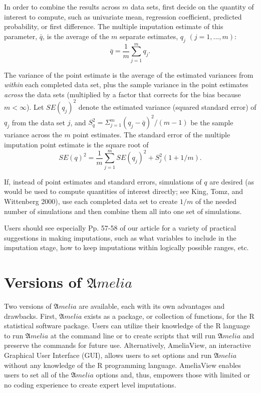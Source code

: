 \documentclass[12pt,titlepage]{article}
\newcommand{\Amelia}{\ensuremath{\mathfrak Amelia} }
\begin{document}
In order to combine the results across $m$ data sets, first decide on the quantity of interest to compute, such as univariate mean, regression coefficient, predicted probability, or first difference.  The multiple imputation estimate of this parameter, $\bar{q}$, is the average of the $m$ separate estimates, $q_j$ $(j=1,...,m)$:
\begin{equation}
\bar{q}=\frac{1}{m}\sum^{m}_{j=1}q_j.  
\end{equation}

The variance of the point estimate is the average of the estimated variances from \emph{within} each completed data set, plus the sample variance in the point estimates \emph{across} the data sets (multiplied by a factor that corrects for the bias because $m<\infty$).  Let $SE(q_j)^2$ denote the estimated variance (squared standard error) of $q_j$ from the data set $j$, and $S^{2}_{q}=\Sigma^{m}_{j=1}(q_j-\bar{q})^2/(m-1)$ be the sample variance across the $m$ point estimates.  The standard error of the multiple imputation point estimate is the square root of
\begin{equation}
SE(q)^2=\frac{1}{m}\sum^{m}_{j=1}SE(q_j)^2+S^{2}_{j}(1+1/m).
\end{equation}

If, instead of point estimates and standard errors, simulations of $q$ are desired (as would be used to compute quantities of interest directly; see King, Tomz, and Wittenberg 2000), use each completed data set to create $1/m$ of the needed number of simulations and then combine them all into one set of simulations.

Users should see especially Pp. 57-58 of our article for a variety of practical suggestions in making imputations, such as what variables to include in the imputation stage, how to keep imputations within logically possible ranges, etc.

\section{Versions of ${\mathfrak Amelia}$}
\label{sec:versions}
Two versions of \Amelia are available, each with its own advantages and drawbacks.  First, \Amelia exists as a package, or collection of functions, for the R statistical software package.  Users can utilize their knowledge of the R language to run \Amelia at the command line or to create scripts that will run \Amelia and preserve the commands for future use.  Alternatively, AmeliaView, an interactive Graphical User Interface (GUI), allows users to set options and run \Amelia without any knowledge of the R programming language.  AmeliaView enables users to set all of the \Amelia options and, thus, empowers those with limited or no coding experience to create expert level imputations.
\end{document}
